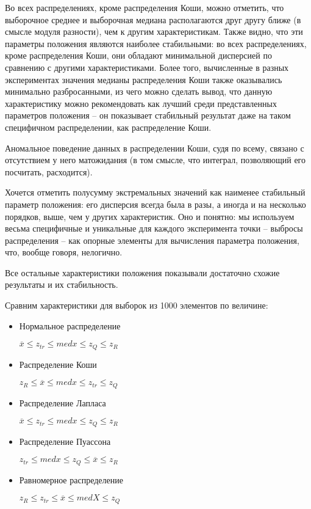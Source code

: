 Во всех распределениях, кроме распределения Коши, можно отметить, что выборочное среднее и выборочная медиана располагаются друг другу ближе (в смысле модуля разности), чем к другим характеристикам. Также видно, что эти параметры положения являются наиболее стабильными: во всех распределениях, кроме распределения Коши, они обладают минимальной дисперсией по сравнению с другими характеристиками. Более того, вычисленные в разных экспериментах значения медианы распределения Коши также оказывались минимально разбросанными, из чего можно сделать вывод, что данную характеристику можно рекомендовать как лучший среди представленных параметров положения -- он показывает стабильный результат даже на таком специфичном распределении, как распределение Коши.

Аномальное поведение данных в распределении Коши, судя по всему, связано с отсутствием у него матожидания (в том смысле, что интеграл, позволяющий его посчитать, расходится).

Хочется отметить полусумму экстремальных значений как наименее стабильный параметр положения: его дисперсия всегда была в разы, а иногда и на несколько порядков, выше, чем у других характеристик. Оно и понятно: мы используем весьма специфичные и уникальные для каждого эксперимента точки -- выбросы распределения -- как опорные элементы для вычисления параметра положения, что, вообще говоря, нелогично.

Все остальные характеристики положения показывали достаточно схожие результаты и их стабильность.

Сравним характеристики для выборок из 1000 элементов по величине:
\begin{itemize}
	\item Нормальное распределение
	
	$\overline{x} \leq z_{tr} \leq med{x} \leq z_Q \leq z_R $
	
	\item Распределение Коши
	
	$z_R \leq \overline{x} \leq med{x} \leq z_{tr} \leq z_Q $
	
	\item Распределение Лапласа
	
	$ \overline{x} \leq z_{tr} \leq med{x} \leq z_Q \leq z_R $
	
	\item Распределение Пуассона
	
	$ z_{tr} \leq med{x} \leq z_Q \leq \overline{x} \leq z_R $
	
	\item Равномерное распределение
	
	$ z_R \leq z_{tr} \leq \overline{x} \leq med{X} \leq z_Q $
	
\end{itemize}
